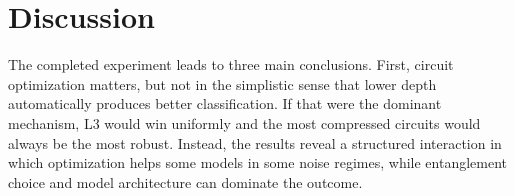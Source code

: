 \documentclass{ieeeaccess}
\begin{document}
\begin{table}[t]
\caption{Stratified 5-fold cross-validation results for QSVC with different feature maps across all dataset and qubit configurations. Accuracy and F1 are reported as percentages.}
\label{tab:cv_results}
\centering
\setlength{\tabcolsep}{5pt}
\end{table}

\section{Discussion}
\label{sec:discussion}

The completed experiment leads to three main conclusions. First, circuit optimization matters, but not in the simplistic sense that lower depth automatically produces better classification. If that were the dominant mechanism, L3 would win uniformly and the most compressed circuits would always be the most robust. Instead, the results reveal a structured interaction in which optimization helps some models in some noise regimes, while entanglement choice and model architecture can dominate the outcome.
\end{document}
